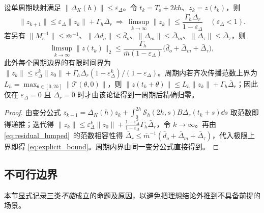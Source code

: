 \begin{proposition}[非理想条件下的显式有界性]\label{prop:approx}
设单周期映射满足 \(\lVert\Delta_K(h)\rVert\le\varepsilon_\Delta\)。令 \(t_k=T_o+2kh\)、\(z_k=z(t_k)\)，则
\begin{equation}
\lVert z_{k+1}\rVert\le\varepsilon_\Delta\lVert z_k\rVert+\Gamma_h\bar\Delta_r
\ \Longrightarrow\
\limsup_{k\to\infty}\lVert z_k\rVert\le\frac{\Gamma_h\bar\Delta_r}{1-\varepsilon_\Delta}\quad(\varepsilon_\Delta<1).
\label{eq:approx_ultimate}
\end{equation}
若另有 \(\lVert M_e^{-1}\rVert\le\bar m^{-1}\)、\(\lVert\Delta d_o\rVert\le\bar d_o\)、\(\lVert\Delta_m\rVert\le\bar\Delta_m\)、\(\lVert\Delta_\tau\rVert\le\bar\Delta_\tau\)，则
\begin{equation}
\limsup_{k\to\infty}\lVert z(t_k)\rVert_2\le\frac{\Gamma_h}{\bar m(1-\varepsilon_\Delta)}\bigl(\bar d_o+\bar\Delta_m+\bar\Delta_\tau\bigr),
\label{eq:explicit_bound}
\end{equation}
此外每个周期边界的有限时间界为 \(\lVert z_k\rVert\le\varepsilon_\Delta^k\lVert z_0\rVert+\Gamma_h\bar\Delta_r(1-\varepsilon_\Delta^k)/(1-\varepsilon_\Delta)\)。周期内若齐次传播范数上界为 \(L_h=\max_{\theta\in[0,2h]}\lVert\mathcal T(\theta,0)\rVert\)，则 \(\lVert z(t_k+\theta)\rVert\le L_h\lVert z_k\rVert+\Gamma_h\bar\Delta_r\)；因此仅在 \(\varepsilon_\Delta=0\) 且 \(\bar\Delta_r=0\) 时才由该论证得到一周期后精确归零。
\end{proposition}

\begin{proof}
由变分公式 \(z_{k+1}=\Delta_K(h)z_k+\int_0^{2h}\mathcal S_h(2h,s)B\Delta_r(t_k+s)\dd s\) 取范数即得递推；迭代得 \(\lVert z_k\rVert\le\varepsilon_\Delta^k\lVert z_0\rVert+\frac{1-\varepsilon_\Delta^k}{1-\varepsilon_\Delta}\Gamma_h\bar\Delta_r\)，令 \(k\to\infty\)。再由 \eqref{eq:residual_lumped}~的范数相容性得 \(\bar\Delta_r\le\bar m^{-1}(\bar d_o+\bar\Delta_m+\bar\Delta_\tau)\)，代入极限上界即得 \eqref{eq:explicit_bound}。周期内界由同一变分公式直接得到。
\end{proof}

\subsection{不可行边界}
\label{sec:infeasible}

本节显式记录三类\emph{不能}成立的命题及原因，以避免把理想结论外推到不具备前提的场景。

